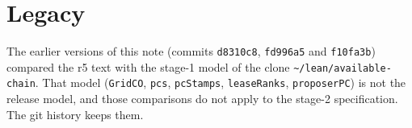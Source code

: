 \documentclass{article}
\newcommand{\nm}[1]{\nolinkurl{#1}}
\begin{document}
\section{Legacy}\label{sec:legacy}

The earlier versions of this note (commits \nm{d8310c8}, \nm{fd996a5} and
\nm{f10fa3b}) compared the r5 text with the stage-1 model of the clone
\nm{~/lean/available-chain}.  That model (\nm{GridCO}, \nm{pcs},
\nm{pcStamps}, \nm{leaseRanks}, \nm{proposerPC}) is not the release
model, and those comparisons do not apply to the stage-2 specification.
The git history keeps them.
\end{document}
